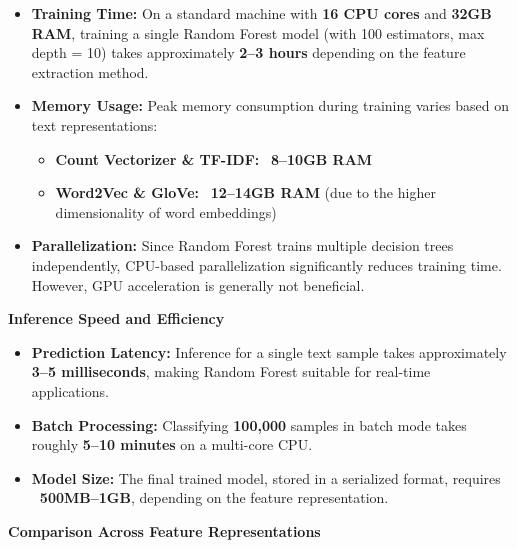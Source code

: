\begin{itemize}
\item \textbf{Training Time:} On a standard machine with \textbf{16 CPU cores} and \textbf{32GB RAM}, training a single Random Forest model (with 100 estimators, max depth = 10) takes approximately \textbf{2--3 hours} depending on the feature extraction method.
\item \textbf{Memory Usage:} Peak memory consumption during training varies based on text representations:
\begin{itemize}
\item \textbf{Count Vectorizer \& TF-IDF:} ~\textbf{8--10GB RAM}
\item \textbf{Word2Vec \& GloVe:} ~\textbf{12--14GB RAM} (due to the higher dimensionality of word embeddings)
\end{itemize}
\item \textbf{Parallelization:} Since Random Forest trains multiple decision trees independently, CPU-based parallelization significantly reduces training time. However, GPU acceleration is generally not beneficial.
\end{itemize}

\textbf{Inference Speed and Efficiency}

\begin{itemize}
\item \textbf{Prediction Latency:} Inference for a single text sample takes approximately \textbf{3--5 milliseconds}, making Random Forest suitable for real-time applications.
\item \textbf{Batch Processing:} Classifying \textbf{100,000} samples in batch mode takes roughly \textbf{5--10 minutes} on a multi-core CPU.
\item \textbf{Model Size:} The final trained model, stored in a serialized format, requires \textbf{~500MB--1GB}, depending on the feature representation.
\end{itemize}

\textbf{Comparison Across Feature Representations}

\begin{table}[H]
\centering
\caption{Computational Resource Analysis for Random Forest}
\label{tab:rf-computational-resources}
\end{table}

